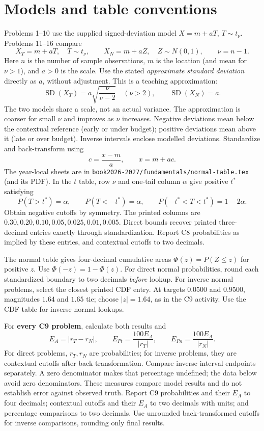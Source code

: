 \section*{Models and table conventions}
Problems 1--10 use the supplied signed-deviation model $X=m+aT$, $T\sim t_\nu$.
Problems 11--16 compare
\[
 X_T=m+aT,\quad T\sim t_\nu,\qquad X_N=m+aZ,\quad Z\sim N(0,1),
 \qquad \boxed{\nu=n-1}.
\]
Here $n$ is the number of sample observations, $m$ is the location (and mean for $\nu>1$), and $a>0$ is the scale.
Use the stated \emph{approximate standard deviation} directly as $a$, without adjustment.
This is a teaching approximation:
\[
 \operatorname{SD}(X_T)=a\sqrt{\frac{\nu}{\nu-2}}\quad(\nu>2),
 \qquad \operatorname{SD}(X_N)=a.
\]
The two models share a scale, not an actual variance. The approximation is coarser for small $\nu$ and improves as $\nu$ increases.
Negative deviations mean below the contextual reference (early or under budget); positive deviations mean above it (late or over budget).
Inverse intervals enclose modelled deviations. Standardize and back-transform using
\[
 \boxed{c=\frac{x-m}{a}},\qquad \boxed{x=m+ac}.
\]
The year-local sheets are in \texttt{book2026-2027/fundamentals/normal-table.tex} (and its PDF).
In the $t$ table, row $\nu$ and one-tail column $\alpha$ give positive $t^*$ satisfying
\[
 P(T>t^*)=\alpha,\qquad P(T<-t^*)=\alpha,\qquad
 P(-t^*<T<t^*)=1-2\alpha.
\]
Obtain negative cutoffs by symmetry. The printed columns are
$0.30,0.20,0.10,0.05,0.025,0.01,0.005$.
Direct bounds recover printed three-decimal entries exactly through standardization.
Report C8 probabilities as implied by these entries, and contextual cutoffs to two decimals.

The normal table gives four-decimal cumulative areas $\Phi(z)=P(Z\le z)$ for positive $z$.
Use $\Phi(-z)=1-\Phi(z)$. For direct normal probabilities, round each standardized boundary to two decimals \emph{before} lookup.
For inverse normal problems, select the closest printed CDF entry.
At targets $0.0500$ and $0.9500$, magnitudes $1.64$ and $1.65$ tie; choose $|z|=1.64$, as in the C9 activity.
Use the CDF table for inverse normal lookups.

For \textbf{every C9 problem}, calculate both results and
\[
 E_A=|r_T-r_N|,\qquad E_{Pt}=\frac{100E_A}{|r_T|},\qquad
 E_{Pn}=\frac{100E_A}{|r_N|}.
\]
For direct problems, $r_T,r_N$ are probabilities; for inverse problems, they are contextual cutoffs after back-transformation.
Compare inverse interval endpoints separately.
A zero denominator makes that percentage undefined; the data below avoid zero denominators.
These measures compare model results and do not establish error against observed truth.
Report C9 probabilities and their $E_A$ to four decimals; contextual cutoffs and their $E_A$ to two decimals with units; and percentage comparisons to two decimals.
Use unrounded back-transformed cutoffs for inverse comparisons, rounding only final results.

